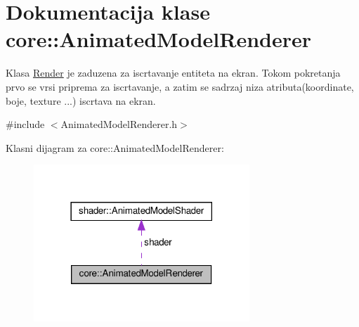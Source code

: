 \hypertarget{classcore_1_1AnimatedModelRenderer}{}\section{Dokumentacija klase core\+:\+:Animated\+Model\+Renderer}
\label{classcore_1_1AnimatedModelRenderer}


Klasa \hyperlink{classcore_1_1Render}{Render} je zaduzena za iscrtavanje entiteta na ekran. Tokom pokretanja prvo se vrsi priprema za iscrtavanje, a zatim se sadrzaj niza atributa(koordinate, boje, texture ...) iscrtava na ekran.  




{\ttfamily \#include $<$Animated\+Model\+Renderer.\+h$>$}



Klasni dijagram za core\+:\+:Animated\+Model\+Renderer\+:
\nopagebreak
\begin{figure}[H]
\begin{center}
\leavevmode
\includegraphics[width=230pt]{classcore_1_1AnimatedModelRenderer__coll__graph}
\end{center}
\end{figure}

